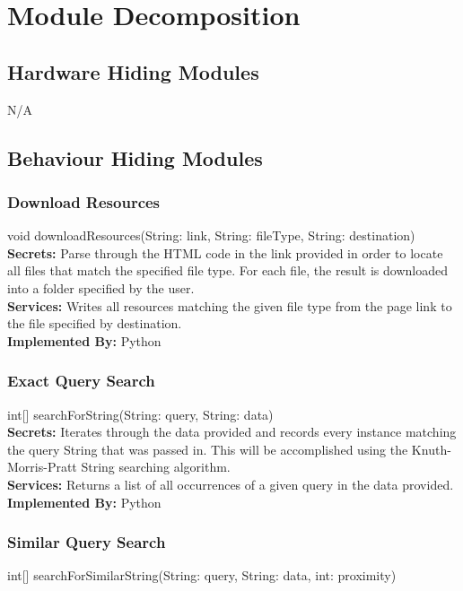 \documentclass[titlepage]{article}
\begin{document}
\section{Module Decomposition}
\subsection{Hardware Hiding Modules}
N/A
\subsection{Behaviour Hiding Modules}
\subsubsection{Download Resources}
void downloadResources(String: link, String: fileType, String: destination)\\

\textbf{Secrets:}
Parse through the HTML code in the link provided in order to locate all files that match the specified file type. For each file, the result is downloaded into a folder specified by the user.\\

\textbf{Services:}
Writes all resources matching the given file type from the page link to the file specified by destination.\\

\textbf{Implemented By:}
Python

\subsubsection{Exact Query Search}
int[] searchForString(String: query, String: data)\\

\textbf{Secrets:}
Iterates through the data provided and records every instance matching the query String that was passed in. This will be accomplished using the Knuth-Morris-Pratt String searching algorithm.\\

\textbf{Services:}
Returns a list of all occurrences of a given query in the data provided.\\

\textbf{Implemented By:}
Python


\subsubsection{Similar Query Search}
int[] searchForSimilarString(String: query, String: data, int: proximity)\\
\end{document}
